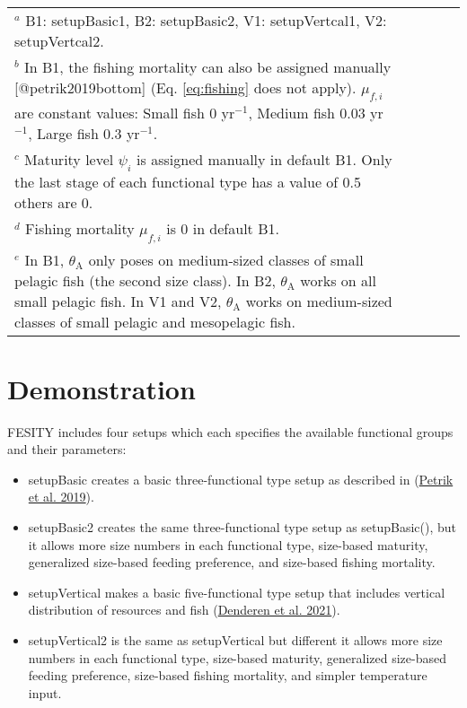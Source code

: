 \documentclass[
]{article}
\providecommand{\tightlist}{%
  \setlength{\itemsep}{0pt}\setlength{\parskip}{0pt}}
\begin{document}
\begin{table}[htbp]
\begin{tabular}{lp{8cm}lp{1cm}lp{1cm}lp{1cm}lp{1cm}l}
\hline
\multicolumn{7}{l}{\footnotesize $^a$ B1: setupBasic1, B2: setupBasic2, V1: setupVertcal1, V2: setupVertcal2.} \\
\multicolumn{7}{p{\dimexpr\linewidth-2\tabcolsep}}{\footnotesize $^b$ In B1, the fishing mortality can also be assigned manually [@petrik2019bottom] (Eq. \ref{eq:fishing} does not apply). $\mu_{f,i}$ are constant values: Small fish 0 yr$^{-1}$, Medium fish 0.03 yr$^{-1}$, Large fish 0.3 yr$^{-1}$.}\\
\multicolumn{7}{p{\dimexpr\linewidth-2\tabcolsep}}{\footnotesize $^c$ Maturity level $\psi_i$ is assigned manually in default B1. Only the last stage of each functional type has a value of 0.5 others are 0.} \\
\multicolumn{7}{l}{\footnotesize $^d$ Fishing  mortality $\mu_{f,i}$ is 0 in default B1.} \\
\multicolumn{7}{p{\dimexpr\linewidth-2\tabcolsep}}{\footnotesize $^e$ In B1, $\theta_{\mathrm{A}}$ only poses on medium-sized classes of small pelagic fish (the second size class).
                                      In B2, $\theta_{\mathrm{A}}$ works on all small pelagic fish. 
                                      In V1 and V2, $\theta_{\mathrm{A}}$ works on medium-sized classes of small pelagic and mesopelagic fish.} \\

\end{tabular}
\end{table}

\hypertarget{demonstration}{%
\section{Demonstration}\label{demonstration}}

FESITY includes four setups which each specifies the available
functional groups and their parameters:

\begin{itemize}
\tightlist
\item
  setupBasic creates a basic three-functional type setup as described in
  (\protect\hyperlink{ref-petrik2019bottom}{Petrik et al. 2019}).
\item
  setupBasic2 creates the same three-functional type setup as
  setupBasic(), but it allows more size numbers in each functional type,
  size-based maturity, generalized size-based feeding preference, and
  size-based fishing mortality.
\item
  setupVertical makes a basic five-functional type setup that includes
  vertical distribution of resources and fish
  (\protect\hyperlink{ref-van2021emergent}{Denderen et al. 2021}).
\item
  setupVertical2 is the same as setupVertical but different it allows
  more size numbers in each functional type, size-based maturity,
  generalized size-based feeding preference, size-based fishing
  mortality, and simpler temperature input.
\end{itemize}
\end{document}
